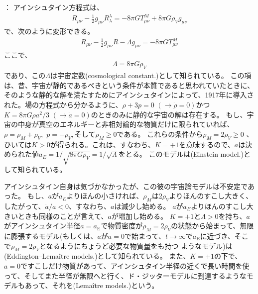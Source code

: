 \documentclass[11pt]{ltjsarticle}
\theoremstyle{plain}
\theoremstyle{break}
\begin{document}
\noindent
{}：
アインシュタイン方程式は、
\begin{align}
  R_{\mu \nu}-\frac{1}{2} g_{\mu \nu} R_{\lambda}^{\lambda}=-8 \pi G T_{\mu \nu}^{M}+8 \pi G \rho_{V} g_{\mu \nu}
\end{align}%
で、次のように変形できる。
\begin{align}
  R_{\mu \nu}-\frac{1}{2} g_{\mu \nu} R-\Lambda g_{\mu \nu}=-8 \pi G T_{\mu \nu}^{M}
\end{align}%
ここで、
\begin{align}
  \Lambda=8 \pi G \rho_{V}
\end{align}%
であり、この$\Lambda$は宇宙定数(cosmological constant.)として知られている。
この項は、昔、宇宙が静的であるべきという条件が本質であると思われていたときに、そのような静的な解を満たすためにアインシュタインによって、1917年に導入された。場の方程式から分かるように、$\rho + 3p = 0 \,\,(\to \dot{\rho} =0)$かつ$K= 8\pi G \rho a^2/3 \,\,(\to \dot{a}=0)$のときのみに静的な宇宙の解は存在する。
もし、宇宙の中身が真空のエネルギーと非相対論的な物質だけに限られていれば、$\rho = \rho_M + \rho_V , \,\, p = - \rho_{V},$そして$\rho_{M} \geq 0$である。
これらの条件から$\rho_{M} = 2 \rho_{V} \geq 0$ 、ひいては$K>0$が得られる。これは、すなわち、$K=+1$を意味するので、$a$は決められた値$a_{E}=1 / \sqrt{8 \pi G \rho_{V}}=1/\sqrt{\Lambda}$をとる。
このモデルは(Einstein model.)として知られている。

アインシュタイン自身は気づかなかったが、この彼の宇宙論モデルは不安定であった。
もし、$a$が$a_{E}$よりほんの小さければ、$\rho_{M}$は$2\rho_{V}$よりほんのすこし大きく、したがって、$\ddot{a}/a < 0$、すなわち、$a$は減少し始める。%
$a$が$a_{E}$よりほんのすこし大きいときも同様のことが言えて、$a$が増加し始める。
$K=+1$と$\Lambda > 0$を持ち、$a$がアインシュタイン半径$a = a_{\mathrm{E}}$で物質密度が$\rho_{M} = 2 \rho_{V}$の状態から始まって、無限に膨張するモデル(もしくは、$a$が$a=0$で始まって、$t \to \infty$で$a_{\mathrm{E}}$に近づき、そこで$\rho_M = 2 \rho_{V}$となるようにちょうど必要な物質量をも持つ
ようなモデル)は(Eddington–Lemaître models.)として知られている。
また、$K = +1$の下で、$a=0$ですこしだけ物質があって、アインシュタイン半径の近くで長い時間を使って、そしてまた半径が無限へと行く、ド・ジッターモデルに到達するようなモデルもあって、それを(Lemaître models.)という。
\end{document}

